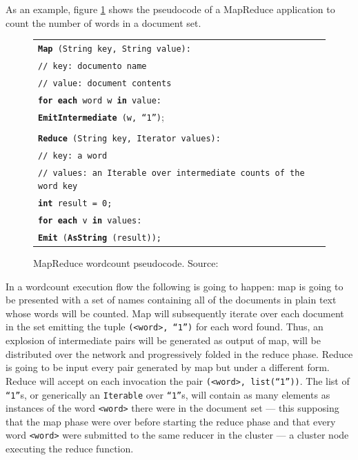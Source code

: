 \noindent As an example, figure \ref{fig:wordcount} shows the pseudocode of a MapReduce application to count the number of words in a document set.

\begin{figure}[tbp]
 \begin{center}
  \begin{tabular}{|l|}
   \hline
   \texttt{{\bf Map} (String key, String value):} \\
   \texttt{// key: documento name} \\
   \texttt{// value: document contents} \\
   \texttt{{\bf for each} word w {\bf in} value:} \\
   \texttt{{\bf EmitIntermediate} (w, ``1'')};\\ \\

   \texttt{{\bf Reduce} (String key, Iterator values):} \\
   \texttt{// key: a word} \\
   \texttt{// values: an Iterable over intermediate counts of the word key} \\
   \texttt{{\bf int} result = 0;} \\
   \texttt{{\bf for each} v {\bf in} values:} \\
   \texttt{{\bf Emit} ({\bf AsString} (result));} \\
   \hline
  \end{tabular}
  \caption{MapReduce wordcount pseudocode. Source: \cite{googlemapreduce}}
  \label{fig:wordcount}
 \end{center}
\end{figure}

In a wordcount execution flow the following is going to happen: map is going to be presented with a set of names containing all of the documents in plain text whose words will be counted. Map will subsequently iterate over each document in the set emitting the tuple \texttt{(<word>, ``1'')} for each word found. Thus, an explosion of intermediate pairs will be generated as output of map, will be distributed over the network and progressively folded in the reduce phase. Reduce is going to be input every pair generated by map but under a different form. Reduce will accept on each invocation the pair \texttt{(<word>, list(``1''))}. The list of \texttt{``1''}s, or generically an \texttt{Iterable} over \texttt{``1''}s, will contain as many elements as instances of the word \texttt{<word>} there were in the document set --- this supposing that the map phase were over before starting the reduce phase and that every word \texttt{<word>} were submitted to the same reducer in the cluster --- a cluster node executing the reduce function.

